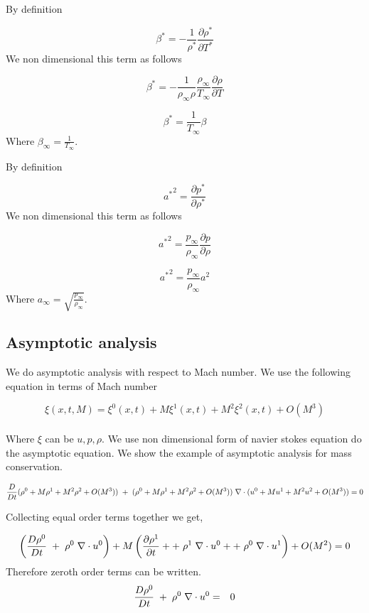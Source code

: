 \documentclass[10pt]{ubthesis}
\begin{document}
\noindent By definition 

$$\beta^*= -\frac{1}{\rho^*}\frac{\partial \rho^*}{\partial T^*}$$ We non dimensional this term as follows 

$$\beta^*= -\frac{1}{\rho_\infty \rho}\frac{\rho_\infty}{T_\infty}\frac{\partial \rho}{\partial T}$$

$$\beta^*= \frac{1}{T_\infty } \beta$$ Where $\beta_\infty = \frac{1}{T_\infty}$. 
\bigskip

\noindent By definition 

$${a^*}^2= \frac{\partial p^*}{\partial \rho^*}$$ We non dimensional this term as follows 

$${a^*}^2= \frac{p_\infty}{\rho_\infty}\frac{\partial p}{\partial \rho}$$

$${a^*}^2= \frac{p_\infty}{\rho_\infty}a^2$$ Where $a_\infty = \sqrt{\frac{p_\infty}{\rho_\infty}}$.

\subsection{Asymptotic analysis}
We do asymptotic analysis with respect to Mach number.
We use the following equation in terms of Mach number

$$\xi(x,t,M)=\xi^0(x,t)+M \xi^1(x,t)+M^2 \xi^2(x,t)+O(M^3)$$ \\

\noindent Where $\xi$ can be $u,p,\rho$. We use non dimensional form of navier stokes equation do the asymptotic equation. 
We show the example of asymptotic analysis for mass conservation. 

$$\frac{D}{D t}(\rho^0+M \rho^1+M^2 \rho^2+O(M^3))\hspace{1mm}+\hspace{1mm}(\rho^0+M \rho^1+M^2 \rho^2+O(M^3)) \hspace{1mm}\nabla \cdot (u^0+M u^1+M^2 u^2+O(M^3)) = 0 $$

Collecting equal order terms together we get,

$$\left(\frac{D \rho^0}{D t}\hspace{1mm}+\hspace{1mm}\rho^0 \hspace{1mm}\nabla \cdot u^0\right) + M \left(\frac{\partial \rho^1 }{\partial t}+ +\hspace{1mm}\rho^1 \hspace{1mm}\nabla \cdot u^0++\hspace{1mm}\rho^0 \hspace{1mm}\nabla \cdot u^1\right) + O(M^2) = 0 $$ Therefore zeroth order terms can be written.
\begin{eqnarray}
\frac{D \rho^0}{D t}\hspace{1mm}+\hspace{1mm}\rho^0 \hspace{1mm}\nabla \cdot u^0 &=& 0
\end{eqnarray}
\end{document}
